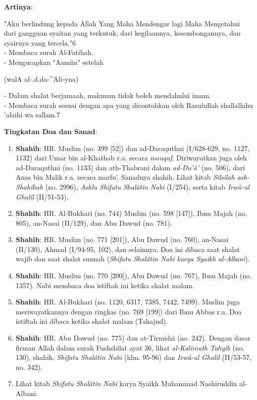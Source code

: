 \documentclass[a4paper,12pt]{article}
\begin{document}
\noindent
\textbf{Artinya}:
\par
\indent
"Aku berlindung kepada Allah Yang Maha Mendengar lagi Maha Mengetahui dari 
gangguan syaitan yang terkutuk, dari kegilaannya, kesombongannya, dan 
syairnya yang tercela."{\scriptsize 6}\\
- Membaca surah Al-Fatihah.\\
- Mengucapkan "Aamiin" setelah \begin{arabtext} (walA al-.d.da-^Ali-yna)
\end{arabtext}
- Dalam shalat berjamaah, makmum tidak boleh mendahului imam.\\
- Membaca surah sesuai dengan apa yang dicontohkan oleh Rasulullah
shallallahu 'alaihi wa sallam.{\scriptsize 7}\\
\par
\noindent
\textbf{Tingkatan Doa dan Sanad}:
\begin{enumerate}
\item \textbf{Shahih}: HR. Muslim (no. 399 [52]) dan ad-Daraquthni 
(I/628-629, no. 1127, 1132) dari Umar bin al-Khathab r.a. secara 
\textit{mauquf}. Diriwayatkan juga oleh ad-Daraquthni (no. 1133) dan 
ath-Thabrani dalam \textit{ad-Du'\^{a}'} (no. 506), dari Anas bin Malik 
r.a. secara marfu'. Sanadnya shahih. Lihat kitab \textit{Silsilah 
ash-Shah\^{i}hah} (no. 2996), \textit{Ashlu Shifatu Shal\^{a}tin Nabi} 
(I/254), serta kitab \textit{Irw\^{a}-ul Ghal\^{i}l} (II/51-53).
\item \textbf{Shahih}: HR. Al-Bukhari (no. 744) Muslim (no. 598 [147]), 
Ibnu Majah (no. 805), an-Nasai (II/129), dan Abu Dawud (no. 781).
\item \textbf{Shahih}: HR. Muslim (no. 771 [201]), Abu Dawud (no. 760), 
an-Nasai (II/130), Ahmad (I/94-95, 102), dan selainnya. Doa ini dibaca saat
shalat wajib dan saat shalat sunnah (\textit{Shifatu Shal\^{a}tin Nabi 
karya Syaikh al-Albani}).                                                  
\item \textbf{Shahih}: HR. Muslim (no. 770 [200]), Abu Dawud (no. 767), 
Ibnu Majah (no. 1357). Nabi membaca doa istiftah ini ketika shalat malam.
\item \textbf{Shahih}: HR. Al-Bukhari (no. 1120, 6317, 7385, 7442, 7499). 
Muslim juga meriwayatkannya dengan ringkas (no. 769 [199]) dari Ibnu Abbas 
r.a. Doa istiftah ini dibaca ketika shalat malam (Tahajud).
\item \textbf{Shahih}: HR. Abu Dawud (no. 775) dan at-Tirmidzi (no. 242). 
Dengan dasar firman Allah dalam surah Fushshilat ayat 36, lihat 
\textit{al-Kalimuth Tahyib} (no. 130), shahih. \textit{Shifatu Shal\^{a}tin
Nabi} (hlm. 95-96) dan \textit{Irw\^{a}-ul Ghal\^{i}l} (II/53-57, no. 342).
\item Lihat kitab \textit{Shifatu Shal\^{a}tin Nabi} karya Syaikh Muhammad 
Nashiruddin al-Albani.\\\\
\end{enumerate}
\end{document}
